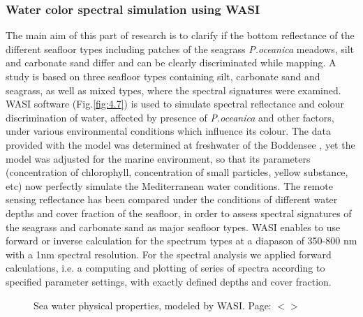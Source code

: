 \documentclass[11pt]{article}
\begin{document}
\subsubsection{Water color spectral simulation using WASI}\label{page-35}
The main aim of this part of research is to clarify if the bottom reflectance of the different seafloor types including patches of
the seagrass \textit{P.oceanica} meadows, silt and carbonate sand differ and can be clearly discriminated while mapping. A study is
based on three seafloor types containing silt, carbonate sand and seagrass, as well as mixed
types, where the spectral signatures were examined. \ac{WASI} software (Fig.\ref{fig:4.7}) is used to simulate
spectral reflectance and colour discrimination of water, affected by presence of \textit{P.oceanica} and other factors, under various
environmental conditions which influence its colour.
The data provided with the model was determined at freshwater of the Boddensee \cite{Gege05}\label{Gege05}, 
yet the model was adjusted for the marine environment, so that its parameters (concentration of chlorophyll, concentration of small particles,
yellow substance, etc) now perfectly simulate the Mediterranean water conditions.
The remote sensing reflectance has been compared under the conditions of different water depths and
cover fraction of the seafloor, in order to assess spectral signatures of the seagrass and carbonate sand
as major seafloor types. \ac{WASI} enables to use forward or inverse calculation for the spectrum types at
a diapason of 350-800 nm with a 1nm spectral resolution. For the spectral analysis we applied
forward calculations, i.e. a computing and plotting of series of spectra according to specified
parameter settings, with exactly defined depths and cover fraction. 

\begin{figure}[H]
	\centering
	\caption{Sea water physical properties, modeled by \ac{WASI}. Page: $<$\pageref{page-36}$>$}
	\label{fig:4.8}
\end{figure}
\end{document}
